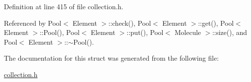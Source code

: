 Definition at line 415 of file collection.h.

Referenced by Pool$<$ Element $>$::check(), Pool$<$ Element $>$::get(), Pool$<$ Element $>$::Pool(), Pool$<$ Element $>$::put(), Pool$<$ Molecule $>$::size(), and Pool$<$ Element $>$::$\sim$Pool().

The documentation for this struct was generated from the following file:\begin{CompactItemize}
\item 
\hyperlink{collection_8h}{collection.h}\end{CompactItemize}
